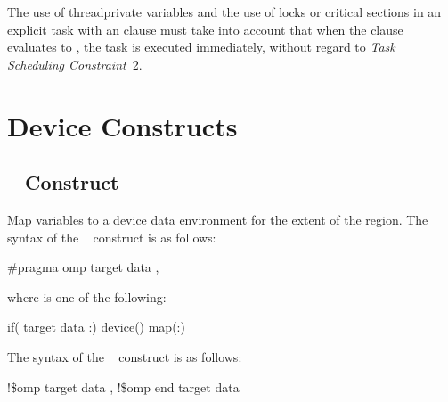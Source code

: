 The use of threadprivate variables and the use of locks or critical sections in an explicit 
task with an  clause must take into account that when the  clause evaluates to 
, the task is executed immediately, without regard to \emph{Task Scheduling Constraint}~2.
\noteend








\section{Device Constructs}
\label{sec:Device Constructs}

\subsection{~ Construct}
\label{subsec:target data Construct}
\summary
 Map variables to a device data environment for the extent of the region.
\syntax
\ccppspecificstart
The syntax of the ~ construct is as follows:

\begin{boxedcode}
\#pragma omp target data \plc{[clause[ [},\plc{] clause] } \plc{... ] new-line}
\end{boxedcode}

\begin{samepage}
where  is one of the following:

\begin{indentedcodelist}
if(\plc{[} target data :\plc{] scalar-expression})
device()
map(\plc{[[map-type-modifier[,]] map-type}:\plc{ ] list})
\end{indentedcodelist}
\ccppspecificend
\medskip
\end{samepage}

\fortranspecificstart
The syntax of the ~ construct is as follows:

\begin{boxedcode}
!\$omp target data \plc{[clause[ [},\plc{] clause] ... ]}
!\$omp end target data
\end{boxedcode}

